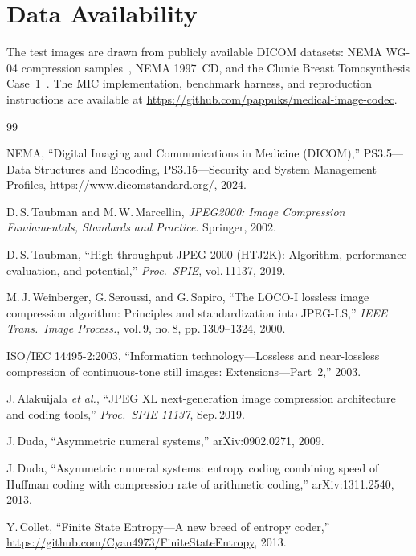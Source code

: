 \documentclass[journal]{IEEEtran}
\begin{document}
\section*{Data Availability}

The test images are drawn from publicly available DICOM datasets:
NEMA WG-04 compression samples~\cite{nema_wg04}, NEMA 1997~CD, and the
Clunie Breast Tomosynthesis Case~1~\cite{clunie_tomo}. The MIC implementation,
benchmark harness, and reproduction instructions are available at
\url{https://github.com/pappuks/medical-image-codec}.


\begin{thebibliography}{99}

NEMA, ``Digital Imaging and Communications in Medicine (DICOM),''
PS3.5---Data Structures and Encoding, PS3.15---Security and System Management
Profiles,
\url{https://www.dicomstandard.org/}, 2024.

D.\,S.\,Taubman and M.\,W.\,Marcellin,
\textit{JPEG2000: Image Compression Fundamentals, Standards and Practice}.
Springer, 2002.

D.\,S.\,Taubman, ``High throughput JPEG 2000 (HTJ2K): Algorithm, performance
evaluation, and potential,'' \textit{Proc.\ SPIE}, vol.\,11137, 2019.

M.\,J.\,Weinberger, G.\,Seroussi, and G.\,Sapiro,
``The LOCO-I lossless image compression algorithm: Principles and
standardization into JPEG-LS,''
\textit{IEEE Trans.\ Image Process.}, vol.\,9, no.\,8, pp.\,1309--1324, 2000.

ISO/IEC 14495-2:2003, ``Information technology---Lossless and near-lossless
compression of continuous-tone still images: Extensions---Part~2,'' 2003.

J.\,Alakuijala \textit{et al.},
``JPEG XL next-generation image compression architecture and coding tools,''
\textit{Proc.\ SPIE 11137}, Sep.\,2019.

J.\,Duda, ``Asymmetric numeral systems,'' arXiv:0902.0271, 2009.

J.\,Duda, ``Asymmetric numeral systems: entropy coding combining speed of
Huffman coding with compression rate of arithmetic coding,''
arXiv:1311.2540, 2013.

Y.\,Collet, ``Finite State Entropy---A new breed of entropy coder,''
\url{https://github.com/Cyan4973/FiniteStateEntropy}, 2013.


\end{thebibliography}
\end{document}
